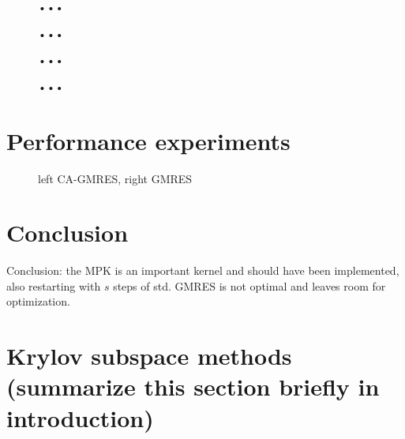 \documentclass{scrartcl}
\numberwithin{equation}{section}
\begin{document}
\begin{figure}
	\centering
	\resizebox{.9\textwidth}{!}{}
	\caption{•••}
	\label{fig:xenon2}
\end{figure}
\begin{figure}
	\centering
	\resizebox{.9\textwidth}{!}{}
	\caption{•••}
	\label{fig:xenon2_scale}
\end{figure}
\begin{figure}
	\centering
	\resizebox{.9\textwidth}{!}{}
	\caption{•••}
	\label{fig:bcsstk18_noscale}
\end{figure}
\begin{figure}
	\centering
	\resizebox{.9\textwidth}{!}{}
	\caption{•••}
	\label{fig:bcsstk18_scale}
\end{figure}

\section{Performance experiments}
\begin{figure}[H]
	\centering
	\resizebox{1.0\textwidth}{!}{}
	\caption{left CA-GMRES, right GMRES}
\end{figure}

\section{Conclusion}
Conclusion: the MPK is an important kernel and should have been implemented, also restarting with $s$ steps of std. GMRES is not optimal and leaves room for optimization.

\iffalse
\section*{Krylov subspace methods (summarize this section briefly in introduction)}
\end{document}
